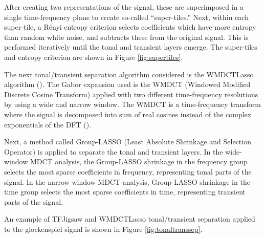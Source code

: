 \documentclass[report.tex]{subfiles}
\begin{document}
After creating two representations of the signal, these are superimposed in a single time-frequency plane to create so-called ``super-tiles.'' Next, within each super-tile, a R{\'e}nyi entropy criterion selects coefficients which have more entropy than random white noise, and subtracts these from the original signal. This is performed iteratively until the tonal and transient layers emerge. The super-tiles and entropy criterion are shown in Figure \ref{fig:supertiles}.

The next tonal/transient separation algorithm considered is the WMDCTLasso algorithm (\cite{wmdct}).\footnotemark{} The Gabor expansion used is the WMDCT (Windowed Modified Discrete Cosine Transform) applied with two different time-frequency resolutions by using a wide and narrow window. The WMDCT is a time-frequency transform where the signal is decomposed into sum of real cosines instead of the complex exponentials of the DFT (\cite{mdct}).

Next, a method called Group-LASSO (Least Absolute Shrinkage and Selection Operator) is applied to separate the tonal and transient layers. In the wide-window MDCT analysis, the Group-LASSO shrinkage in the frequency group selects the most sparse coefficients in frequency, representing tonal parts of the signal. In the narrow-window MDCT analysis,  Group-LASSO shrinkage in the time group selects the most sparse coefficients in time, representing transient parts of the signal.

An example of TFJigsaw and WMDCTLasso tonal/transient separation applied to the glockenspiel signal is shown in Figure \ref{fig:tonaltranssep}.
\end{document}
